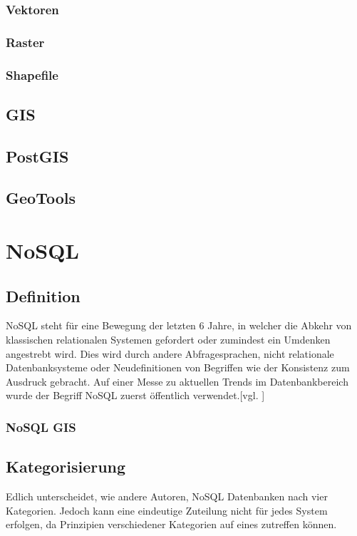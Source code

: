 \subsubsection{Vektoren}

\subsubsection{Raster}

\subsubsection{Shapefile}

\subsection{GIS}

\subsection{PostGIS}

\subsection{GeoTools}



\section{NoSQL}

\subsection{Definition}

NoSQL steht für eine Bewegung der letzten 6 Jahre, in welcher die Abkehr von klassischen relationalen Systemen gefordert oder zumindest ein Umdenken angestrebt wird.
Dies wird durch andere Abfragesprachen, nicht relationale Datenbanksysteme oder Neudefinitionen von Begriffen wie der Konsistenz zum Ausdruck gebracht.
Auf einer Messe zu aktuellen Trends im Datenbankbereich wurde der Begriff NoSQL zuerst öffentlich verwendet.[vgl. ]

\subsubsection{NoSQL GIS}


\subsection{Kategorisierung}
Edlich unterscheidet, wie andere Autoren, NoSQL Datenbanken nach vier Kategorien.
Jedoch kann eine eindeutige Zuteilung nicht für jedes System erfolgen, da Prinzipien verschiedener Kategorien auf eines zutreffen können.


